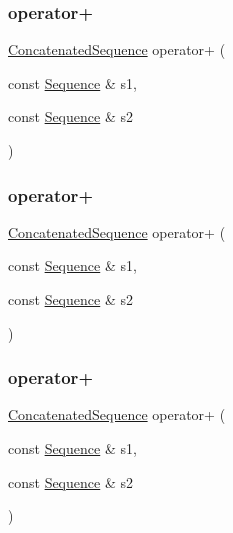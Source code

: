\subsubsection{\texorpdfstring{operator+}{operator+}\hspace{0.1cm}{\footnotesize\ttfamily [1/9]}}
{\footnotesize\ttfamily \mbox{\hyperlink{classfakeit_1_1ConcatenatedSequence}{Concatenated\+Sequence}} operator+ (\begin{DoxyParamCaption}\item[{const \mbox{\hyperlink{classfakeit_1_1Sequence}{Sequence}} \&}]{s1,  }\item[{const \mbox{\hyperlink{classfakeit_1_1Sequence}{Sequence}} \&}]{s2 }\end{DoxyParamCaption})\hspace{0.3cm}{\ttfamily [friend]}}

\mbox{\label{classfakeit_1_1ConcatenatedSequence_adb09b1b1e32428d0c2f46bd549141cdd}} 
\subsubsection{\texorpdfstring{operator+}{operator+}\hspace{0.1cm}{\footnotesize\ttfamily [2/9]}}
{\footnotesize\ttfamily \mbox{\hyperlink{classfakeit_1_1ConcatenatedSequence}{Concatenated\+Sequence}} operator+ (\begin{DoxyParamCaption}\item[{const \mbox{\hyperlink{classfakeit_1_1Sequence}{Sequence}} \&}]{s1,  }\item[{const \mbox{\hyperlink{classfakeit_1_1Sequence}{Sequence}} \&}]{s2 }\end{DoxyParamCaption})\hspace{0.3cm}{\ttfamily [friend]}}

\mbox{\label{classfakeit_1_1ConcatenatedSequence_adb09b1b1e32428d0c2f46bd549141cdd}} 
\subsubsection{\texorpdfstring{operator+}{operator+}\hspace{0.1cm}{\footnotesize\ttfamily [3/9]}}
{\footnotesize\ttfamily \mbox{\hyperlink{classfakeit_1_1ConcatenatedSequence}{Concatenated\+Sequence}} operator+ (\begin{DoxyParamCaption}\item[{const \mbox{\hyperlink{classfakeit_1_1Sequence}{Sequence}} \&}]{s1,  }\item[{const \mbox{\hyperlink{classfakeit_1_1Sequence}{Sequence}} \&}]{s2 }\end{DoxyParamCaption})\hspace{0.3cm}{\ttfamily [friend]}}

